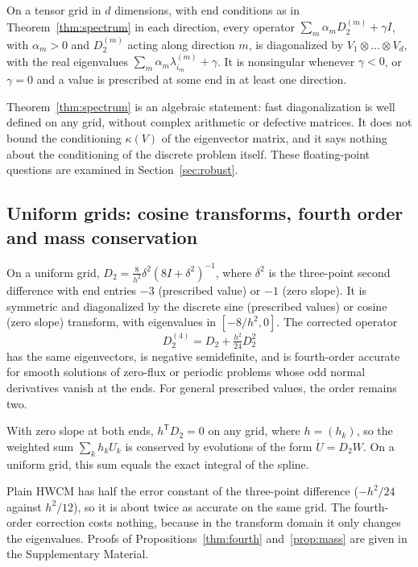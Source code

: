 \begin{corollary}\label{cor:tensor}
On a tensor grid in $d$ dimensions, with end conditions as in Theorem~\ref{thm:spectrum} in each direction,
every operator $\sum_m\alpha_mD_2^{(m)}+\gamma I$, with $\alpha_m>0$ and $D_2^{(m)}$ acting along direction
$m$, is diagonalized by $V_1\otimes\dots\otimes V_d$, with the real eigenvalues
$\sum_m\alpha_m\lambda^{(m)}_{i_m}+\gamma$. It is nonsingular whenever $\gamma<0$, or $\gamma=0$ and a value
is prescribed at some end in at least one direction.
\end{corollary}

Theorem~\ref{thm:spectrum} is an algebraic statement: fast diagonalization is well defined on any grid,
without complex arithmetic or defective matrices. It does not bound the conditioning $\kappa(V)$ of the
eigenvector matrix, and it says nothing about the conditioning of the discrete problem itself. These
floating-point questions are examined in Section~\ref{sec:robust}.

\subsection{Uniform grids: cosine transforms, fourth order and mass conservation}
\begin{proposition}\label{thm:fourth}
On a uniform grid, $D_2=\frac{8}{h^2}\delta^2(8I+\delta^2)^{-1}$, where $\delta^2$ is the three-point second
difference with end entries $-3$ (prescribed value) or $-1$ (zero slope). It is symmetric and diagonalized
by the discrete sine (prescribed values) or cosine (zero slope) transform, with eigenvalues in
$[-8/h^2,0]$. The corrected operator
\begin{equation}\label{eq:D24}
D_2^{(4)}=D_2+\tfrac{h^2}{24}D_2^2
\end{equation}
has the same eigenvectors, is negative semidefinite, and is fourth-order accurate for smooth solutions
of zero-flux or periodic problems whose odd normal derivatives vanish at the ends. For general prescribed
values, the order remains two.
\end{proposition}

\begin{proposition}\label{prop:mass}
With zero slope at both ends, $h^{\mathsf T}D_2=0$ on any grid, where $h=(h_k)$, so the weighted sum
$\sum_kh_kU_k$ is conserved by evolutions of the form $\dot U=D_2W$. On a uniform grid, this sum equals the
exact integral of the spline.
\end{proposition}

Plain HWCM has half the error constant of the three-point difference ($-h^2/24$ against $h^2/12$), so it is
about twice as accurate on the same grid. The fourth-order correction costs nothing, because in the
transform domain it only changes the eigenvalues. Proofs of Propositions~\ref{thm:fourth}
and~\ref{prop:mass} are given in the Supplementary Material.

